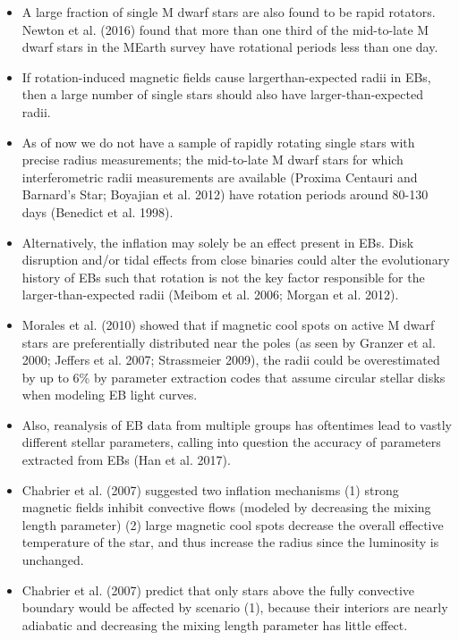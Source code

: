 \begin{itemize}
\item A large fraction of single M dwarf stars are also found to be rapid rotators. Newton et al. (2016) found that more than one third of the mid-to-late M dwarf stars in the MEarth survey have rotational periods less than one day.

\item If rotation-induced magnetic fields cause largerthan-expected radii in EBs, then a large number of single stars should also have larger-than-expected radii. 

\item As of now we do not have a sample of rapidly rotating single stars with precise radius measurements; the mid-to-late M dwarf stars for which interferometric radii measurements are available (Proxima Centauri and Barnard’s Star; Boyajian et al. 2012) have rotation periods around 80-130 days (Benedict et al. 1998).

\item Alternatively, the inflation may solely be an effect present in EBs. Disk disruption and/or tidal effects from close binaries could alter the evolutionary history of EBs such that rotation is not the key factor responsible for the larger-than-expected radii (Meibom et al. 2006; Morgan et al. 2012).

\item Morales et al. (2010) showed that if magnetic cool spots on active M dwarf stars are preferentially distributed near the poles (as seen by Granzer et al. 2000; Jeffers et al. 2007; Strassmeier 2009), the radii could be overestimated by up to 6\% by parameter extraction codes that assume circular stellar disks when modeling EB light curves.

\item Also, reanalysis of EB data from multiple groups has oftentimes lead to vastly different stellar parameters, calling into question the accuracy of parameters extracted from EBs (Han et al. 2017).

\item Chabrier et al. (2007) suggested two inflation mechanisms (1)  strong magnetic fields inhibit convective flows (modeled by decreasing the mixing length parameter) (2)  large magnetic cool spots decrease the overall effective temperature of the star, and thus increase the radius since the luminosity is unchanged.

\item Chabrier et al. (2007) predict that only stars above the fully convective boundary would be affected by scenario (1), because their interiors are nearly adiabatic and decreasing
the mixing length parameter has little effect.


\end{itemize}
